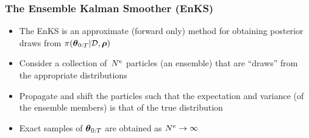 \begin{frame}
\frametitle{The Ensemble Kalman Smoother (EnKS)}
\bigskip
\begin{itemize}
\item The EnKS is an approximate (forward only) method for obtaining posterior draws from $\pi(\boldsymbol{\theta}_{0:T}|\mathcal{D}, \boldsymbol{\rho})$
\bigskip
\item Consider a collection of~${N^\text{e}}$ particles (an ensemble) that are ``draws'' from the appropriate distributions
\bigskip
\item Propagate and shift the particles such that the expectation and variance (of the ensemble members) is that of the true distribution
\bigskip
\item Exact samples of $\boldsymbol{\theta}_{0:T}$ are obtained as ${N^\text{e}} \to \infty$ 
\end{itemize}
\end{frame}


